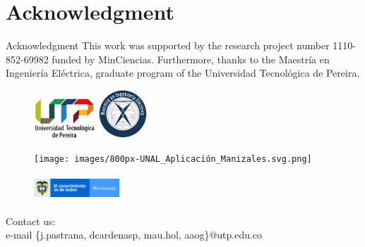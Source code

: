 \documentclass[10pt, xcolor=table]{beamer}
\begin{document}
\section*{Acknowledgment}
\begin{frame}{Acknowledgment}
    This work was supported by the research project number 1110-852-69982 funded by MinCiencias. Furthermore,  thanks to the Maestría en Ingeniería Eléctrica, graduate program of the Universidad Tecnológica de Pereira.

\begin{figure}
    \centering
    \begin{minipage}[t]{0.2\textwidth}
        \centering
        \includegraphics[width=2.3cm,height=1.5cm]{images/Logo_U.T.P.png}
    \end{minipage}
    \hfill
    \begin{minipage}[t]{0.15\textwidth}
        \centering
        \includegraphics[width=1.8cm,height=1.8cm]{images/logo-maestria-scaled.jpg}
    \end{minipage}
    \hfill
    \begin{minipage}[t]{0.28\textwidth}
        \centering
        \texttt{[image: images/800px-UNAL\_Aplicación\_Manizales.svg.png]}
    \end{minipage}
    \hfill
    \begin{minipage}[t]{0.28\textwidth}
        \centering
        \includegraphics[width=3.2cm,height=1cm]{images/1200px-Minciencias_Colombia.svg.png}
    \end{minipage}
\end{figure}


\begin{center}
    Contact us:\\
    e-mail \{j.pastrana, dcardenasp, mau.hol, aaog\}@utp.edu.co
\end{center}

\end{frame}
\end{document}
